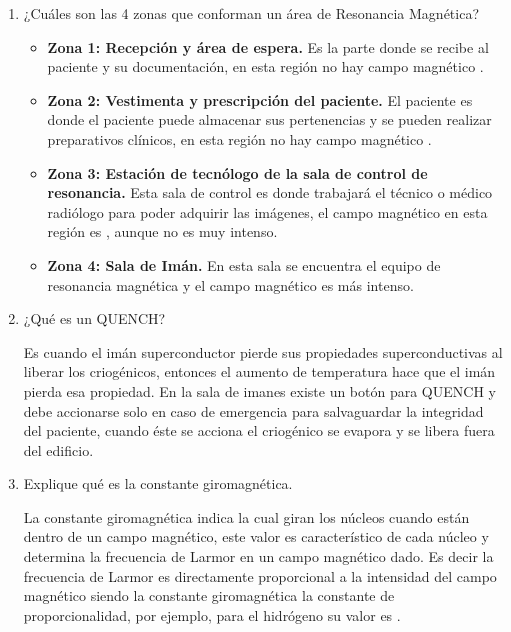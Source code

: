 \newlength{\strutheight}
\settoheight{\strutheight}{\strut}


\begin{enumerate}
  \item ¿Cuáles son las 4 zonas que conforman un área de Resonancia Magnética?
  
\begin{itemize}
  \item \textbf{Zona 1: Recepción y área de espera.} Es la parte donde se recibe al paciente y su documentación, en esta región no hay campo magnético .
  \item \textbf{Zona 2: Vestimenta y prescripción del paciente.} El paciente es donde el paciente puede almacenar sus pertenencias y se pueden realizar preparativos clínicos, en esta región no hay campo magnético .
  \item \textbf{Zona 3: Estación de tecnólogo de la sala de control de resonancia.} Esta sala de control es donde trabajará el técnico o médico radiólogo para poder adquirir las imágenes, el campo magnético en esta región es , aunque no es muy intenso.
  \item \textbf{Zona 4: Sala de Imán.} En esta sala se encuentra el equipo de resonancia magnética y el campo magnético es más intenso. 
\end{itemize}


  \item ¿Qué es un QUENCH?
  
  Es cuando el imán superconductor pierde sus propiedades superconductivas al liberar los criogénicos, entonces el aumento de temperatura hace que el imán pierda esa propiedad. En la sala de imanes existe un botón para QUENCH y debe accionarse solo en caso de emergencia para salvaguardar la integridad del paciente, cuando éste se acciona el criogénico se evapora y se libera fuera del edificio.



  \item Explique qué es la constante giromagnética.
  
La constante giromagnética \ec{\gamma} indica la cual giran los núcleos cuando están dentro de un campo magnético, este valor es característico de cada núcleo y determina la frecuencia de Larmor \ec{\omega} en un campo magnético  dado. Es decir la frecuencia de Larmor es directamente proporcional a la intensidad del campo magnético siendo la constante giromagnética la constante de proporcionalidad, por ejemplo, para el hidrógeno su valor es .




\end{enumerate}
